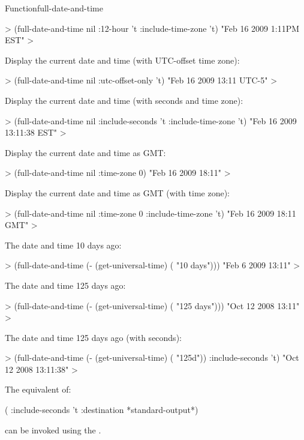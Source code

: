 \documentclass[10pt,twoside,english,pdftex]{article}
\begin{document}
\begin{functiondoc}{Function}{full-date-and-time}
\begin{example}
  > (full-date-and-time nil :12-hour 't :include-time-zone 't)
  "Feb 16 2009 1:11PM EST"
  >
\end{example}
%
Display the current date and time (with UTC-offset time zone):
%
\W\supp\notpretop
\begin{example}
  > (full-date-and-time nil :utc-offset-only 't)
  "Feb 16 2009 13:11 UTC-5"
  >
\end{example}
%
Display the current date and time (with seconds and time zone):
%
\W\supp\notpretop
\begin{example}
  > (full-date-and-time nil
      :include-seconds 't 
      :include-time-zone 't)
  "Feb 16 2009 13:11:38 EST"
  >
\end{example}
%
Display the current date and time as GMT: 
%
\W\supp\notpretop
\begin{example}
  > (full-date-and-time nil :time-zone 0)
  "Feb 16 2009 18:11"
  >
\end{example}
Display the current date and time as GMT (with time zone):
%
\W\supp\notpretop
\begin{example}
  > (full-date-and-time nil 
      :time-zone 0 
      :include-time-zone 't)
  "Feb 16 2009 18:11 GMT"
  >
\end{example}
%
The date and time 10 days ago:
%
%
\W\supp\notpretop
\begin{example}
  > (full-date-and-time (- (get-universal-time) ( "10 days")))
  "Feb  6 2009 13:11"
  >
\end{example}
%
The date and time 125 days ago:
%
\W\supp\notpretop
\begin{example}
  > (full-date-and-time (- (get-universal-time) ( "125 days")))
  "Oct 12 2008 13:11"
  >
\end{example}
%
The date and time 125 days ago (with seconds):
%
\W\supp\notpretop
\begin{example}
  > (full-date-and-time (- (get-universal-time) ( "125d"))
      :include-seconds 't)
  "Oct 12 2008 13:11:38"
  >
\end{example}

\replnote 
%
%
%
The equivalent of:
%
\W\supp
\begin{example}
  (  
     :include-seconds 't
     :destination *standard-output*)
\end{example} 
%
can be invoked using the  .

\end{functiondoc}
\end{document}
